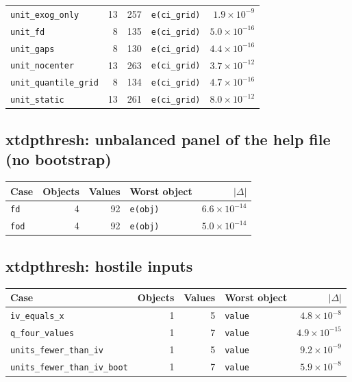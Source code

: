 \documentclass[10.5pt,a4paper]{article}
\begin{document}
\begin{longtable}{@{}p{3.6cm}rrp{4.9cm}r@{}}
\texttt{unit\_\allowbreak{}exog\_\allowbreak{}only} & 13 & 257 & \texttt{e(ci\_\allowbreak{}grid)} & $1.9\times10^{-9}$ \\
\texttt{unit\_\allowbreak{}fd} & 8 & 135 & \texttt{e(ci\_\allowbreak{}grid)} & $5.0\times10^{-16}$ \\
\texttt{unit\_\allowbreak{}gaps} & 8 & 130 & \texttt{e(ci\_\allowbreak{}grid)} & $4.4\times10^{-16}$ \\
\texttt{unit\_\allowbreak{}nocenter} & 13 & 263 & \texttt{e(ci\_\allowbreak{}grid)} & $3.7\times10^{-12}$ \\
\texttt{unit\_\allowbreak{}quantile\_\allowbreak{}grid} & 8 & 134 & \texttt{e(ci\_\allowbreak{}grid)} & $4.7\times10^{-16}$ \\
\texttt{unit\_\allowbreak{}static} & 13 & 261 & \texttt{e(ci\_\allowbreak{}grid)} & $8.0\times10^{-12}$ \\
\bottomrule
\end{longtable}

\subsection*{xtdpthresh: unbalanced panel of the help file (no bootstrap)}

\begin{longtable}{@{}p{3.6cm}rrp{4.9cm}r@{}}
\toprule
Case & Objects & Values & Worst object & $|\Delta|$ \\
\midrule
\endhead
\texttt{fd} & 4 & 92 & \texttt{e(obj)} & $6.6\times10^{-14}$ \\
\texttt{fod} & 4 & 92 & \texttt{e(obj)} & $5.0\times10^{-14}$ \\
\bottomrule
\end{longtable}

\subsection*{xtdpthresh: hostile inputs}

\begin{longtable}{@{}p{3.6cm}rrp{4.9cm}r@{}}
\toprule
Case & Objects & Values & Worst object & $|\Delta|$ \\
\midrule
\endhead
\texttt{iv\_\allowbreak{}equals\_\allowbreak{}x} & 1 & 5 & \texttt{value} & $4.8\times10^{-8}$ \\
\texttt{q\_\allowbreak{}four\_\allowbreak{}values} & 1 & 7 & \texttt{value} & $4.9\times10^{-15}$ \\
\texttt{units\_\allowbreak{}fewer\_\allowbreak{}than\_\allowbreak{}iv} & 1 & 5 & \texttt{value} & $9.2\times10^{-9}$ \\
\texttt{units\_\allowbreak{}fewer\_\allowbreak{}than\_\allowbreak{}iv\_\allowbreak{}boot} & 1 & 7 & \texttt{value} & $5.9\times10^{-8}$ \\
\bottomrule
\end{longtable}
\end{document}
